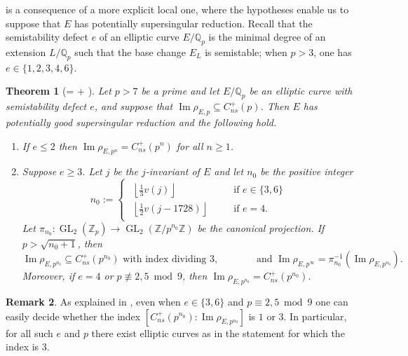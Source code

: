 \documentclass{amsart}
\newcommand{\Qp}{\mathbb{Q}_p}
\newtheorem{theorem}{Theorem}
\theoremstyle{definition}
\newtheorem{remark}[theorem]{Remark}
\newcommand{\Z}{\mathbb{Z}}
\newcommand{\Q}{\mathbb{Q}}
\newcommand{\GL}{\operatorname{GL}}
\numberwithin{theorem}{section}
\numberwithin{equation}{section}
\begin{document}
 is a consequence of a more explicit local one, where the hypotheses enable us to suppose that $E$ has potentially supersingular reduction. Recall that the semistability defect $e$ of an elliptic curve $E/\Qp$ is the minimal degree of an extension $L/\Qp$ such that the base change $E_L$ is semistable; when $p>3$, one has $e \in \{1,2,3,4,6\}$.


\begin{theorem}[= + ]\label{introthm: more precise description padic Galreps}
    Let $p>7$ be a prime and let $E/\Q_p$ be an elliptic curve with semistability defect $e$, and suppose that $\operatorname{Im}\rho_{E,p} \subseteq C_{ns}^+(p)$. Then $E$ has potentially good supersingular reduction and the following hold.
    \begin{enumerate}
        \item If $e\leq 2$ then $\operatorname{Im}\rho_{E,p^n} = C_{ns}^+(p^n)$ for all $n \geq 1$.
        \item Suppose $e \geq 3$. Let $j$ be the $j$-invariant of $E$ and let $n_0$ be the positive integer
    \[
    n_0 := \begin{cases}
    \begin{array}{lll}
    \!\left\lfloor \frac{1}{3}v(j) \right\rfloor & \quad & \text{if $e \in \{3,6\}$} \\
    \!\left\lfloor \frac{1}{2}v(j-1728) \right\rfloor & \quad & \text{if $e = 4$.}
    \end{array}
    \end{cases}
    \]
    Let $\pi_{n_0} : \GL_2(\Z_p) \to \GL_2(\Z/p^{n_0}\Z)$ be the canonical projection. If $p>\sqrt{n_0+1}$, then 
\[
\operatorname{Im}\rho_{E,p^{n_0}} \subseteq C_{ns}^+(p^{n_0}) \text{ with index dividing $3$,} \qquad\qquad \text{and} \,\, \operatorname{Im}\rho_{E,p^\infty} = \pi_{n_0}^{-1}(\operatorname{Im}\rho_{E,p^{n_0}}).
\]
Moreover, if $e=4$ or $p \not\equiv 2,5 \bmod 9$, then $\operatorname{Im}\rho_{E,p^{n_0}} = C_{ns}^+(p^{n_0})$. 
    \end{enumerate}
\end{theorem}

\begin{remark}
    As explained in , even when $e \in \{3,6\}$ and $p \equiv 2,5 \bmod 9$ one can easily decide whether the index $[C_{ns}^+(p^{n_0}) : \operatorname{Im}\rho_{E,p^{n_0}}]$ is $1$ or $3$. In particular, for all such $e$ and $p$ there exist elliptic curves as in the statement for which the index is $3$.
\end{remark}
\end{document}
